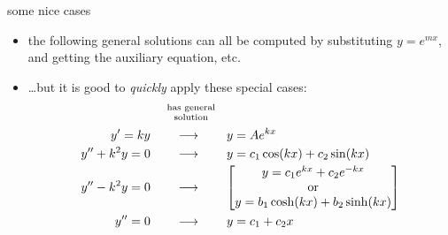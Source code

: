 \documentclass{beamer}
\begin{document}
\begin{frame}{some nice cases}

\begin{itemize}
\item the following general solutions can all be computed by substituting $y=e^{mx}$, and getting the auxiliary equation, etc.
\item \dots but it is good to \emph{quickly} apply these special cases:
\newcommand{\genarrow}{\qquad \longrightarrow \qquad}
\begin{align*}
 &\quad\,\, {\scriptsize \begin{matrix} \text{has general} \\ \text{solution} \end{matrix} } \\
y' = k y &\genarrow y=Ae^{kx} \\
y'' + k^2 y = 0 &\genarrow y=c_1\cos(kx) + c_2\sin(kx) \\
y'' - k^2 y = 0 &\genarrow \left[\begin{matrix} y=c_1e^{kx}+c_2e^{-kx} \\
                                      \text{or} \\
                                      y=b_1\cosh(k x) + b_2\sinh(k x)\end{matrix}\right] \\
y'' = 0 &\genarrow y=c_1 + c_2 x
\end{align*}
\end{itemize}
\end{frame}
\end{document}
